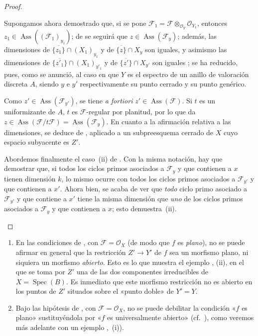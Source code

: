 \begin{proof}
\begin{env}[12.1.1.4]
Supongamos ahora demostrado que, si se pone $\mathcal F_1=\mathcal F\otimes_{\mathcal O_Y}\mathcal O_{Y_1}$, entonces $z_1\in\operatorname{Ass}((\mathcal F_1)_{y_1})$; de  se seguirá que $z\in\operatorname{Ass}(\mathcal F_y)$; además, las dimensiones de $\overline{\{z_1\}}\cap(X_1)_{y_1}$ y de $\overline{\{z\}}\cap X_y$ son iguales, y asimismo las dimensiones de $\overline{\{z'_1\}}\cap(X_1)_{y'_1}$ y de $\overline{\{z'\}}\cap X_{y'}$ son iguales ; se ha reducido, pues, como se anunció, al caso en que $Y$ es el espectro de un anillo de valoración discreta $A$, siendo $y$ e $y'$ respectivamente su punto cerrado y su punto genérico.

Como $z'\in\operatorname{Ass}(\mathcal F_{y'})$, se tiene \emph{a fortiori} $z'\in\operatorname{Ass}(\mathcal F)$.
Si $t$ es un uniformizante de $A$, $t$ es $\mathcal F$-regular por planitud, por lo que  da $z\in\operatorname{Ass}(\mathcal F/t\mathcal F)
=\operatorname{Ass}(\mathcal F_y)$.
En cuanto a la afirmación relativa a las dimensiones, se deduce de , aplicado a un subpreesquema cerrado de $X$ cuyo espacio subyacente es $Z'$.

Abordemos finalmente el caso~(ii) de .
Con la misma notación, hay que demostrar que, si todos los ciclos primos asociados a $\mathcal F_y$ y que contienen a $x$ tienen dimensión $k$, lo mismo ocurre con todos los ciclos primos asociados a $\mathcal F_{y'}$ y que contienen a $x'$.
Ahora bien, se acaba de ver que \emph{todo} ciclo primo asociado a $\mathcal F_{y'}$ y que contiene a $x'$ tiene la misma dimensión que \emph{uno} de los ciclos primos asociados a $\mathcal F_y$ y que contienen a $x$; esto demuestra~(ii).
\end{env}

\end{proof}

\begin{remarks}[12.1.2]
\label{IV.12.1.2}
\begin{enumerate}[label=(\roman*)]
  \item En las condiciones de , con $\mathcal F=\mathcal O_X$ (de modo que $f$ es \emph{plano}), no se puede afirmar en general que la restricción $Z'\to Y'$ de $f$ sea un morfismo plano, ni siquiera un morfismo \emph{abierto}.
Esto es lo que muestra el ejemplo ,
(ii), en el que se toma por $Z'$ una de las dos componentes irreducibles de $X=\operatorname{Spec}(B)$.
Es inmediato que este morfismo restricción no es abierto en los puntos de $Z'$ situados sobre el «punto doble» de $Y'=Y$.

  \item Bajo las hipótesis de , con $\mathcal F=\mathcal O_X$, no se puede debilitar la condición «$f$ es plano» sustituyéndola por «$f$ es universalmente abierto» (cf.\ ), como veremos más adelante con un ejemplo ,~(i)).
\end{enumerate}
\end{remarks}

